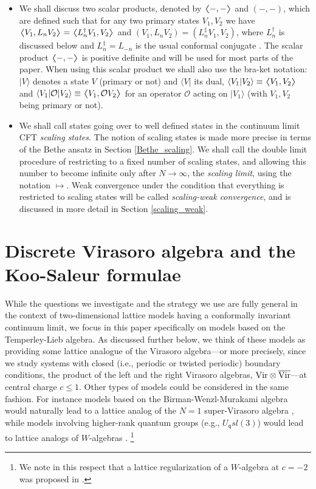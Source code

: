 \documentclass[a4paper,10pt]{article}
\newcommand{\q}{\mathfrak{q}}
\newcommand{\VirN}{\hbox{Vir}\otimes\overline{\hbox{Vir}}}
\newcommand{\spindagger}{\dag}
\newcommand{\loopdagger}{\ddag}
\newcommand{\spininner}[2]{\scalebox{1.5}[1]{$\langle$}  #1, #2 \scalebox{1.5}[1]{$\rangle$} }
\newcommand{\loopinner}[2]{( #1, #2 )}
\begin{document}
\begin{itemize}
\item{} We shall discuss two scalar products, denoted by $\spininner{-}{-}$ and $\loopinner{-}{-}$, which are defined such that for any two primary states $V_1,V_2$ we have $\spininner{V_1}{L_n V_2} = \spininner{L_n^\spindagger V_1}{V_2}$ and $\loopinner{V_1}{L_n V_2} = \loopinner{L_n^\loopdagger V_1}{V_2}$, where $L_n^\spindagger$ is discussed below and $L_n^\loopdagger=L_{-n}$ is the usual conformal conjugate \cite{BPZ}. The scalar product $\spininner{-}{-}$ is positive definite and will be used for most parts of the paper. When using this scalar product we shall also use the bra-ket notation: $|V\rangle$ denotes a state $V$ (primary or not) and $\langle V|$ its dual, $\langle V_1 | V_2\rangle \equiv \spininner{V_1}{V_2} $ and $\langle V_1| \mathcal{O} |V_2 \rangle \equiv \spininner{V_1}{\mathcal{O}V_2}$ for an operator $\mathcal{O}$ acting on $|V_1\rangle$ (with $V_1,V_2$ being primary or not). 

\item{} We shall call states going over to well defined states in the continuum limit CFT  {\sl scaling states}. The notion of scaling states is made more precise in terms of the Bethe ansatz in Section \ref{Bethe_scaling}.
 We shall call the double limit procedure of restricting to a fixed number of scaling states, and allowing this number to become infinite only after $N\to\infty$, the {\sl scaling limit}, using the notation $\mapsto$. Weak convergence under the condition that everything is restricted to scaling states will be called {\sl scaling-weak convergence}, and is discussed in more detail in Section \ref{scaling_weak}.


\end{itemize}

\section{Discrete Virasoro algebra and the Koo-Saleur formulae}\label{sec:disVir}

While the questions we investigate and the strategy we use are fully general in the context of two-dimensional lattice models having a conformally invariant continuum limit, we focus in this paper specifically on models based on the Temperley-Lieb algebra. As discussed further below, we think of these models as providing some lattice analogue of the Virasoro algebra---or more precisely, since we study systems with closed (i.e., periodic or twisted periodic) boundary conditions, the product of the left and the right Virasoro algebras, $\VirN$---at central charge $c\leq1$. Other types of models could be considered in the same fashion. For instance  models based on the Birman-Wenzl-Murakami algebra  would naturally lead to a lattice analog of the $N=1$ super-Virasoro algebra \cite{Pearce2013}, while models involving higher-rank quantum groups (e.g., $U_\q sl(3)$) would lead to lattice analogs of $W$-algebras \cite{GJprep}.%
\footnote{We note in this respect that a lattice regularization of a $W$-algebra at $c=-2$ was proposed in \cite{GST}.}
\end{document}
